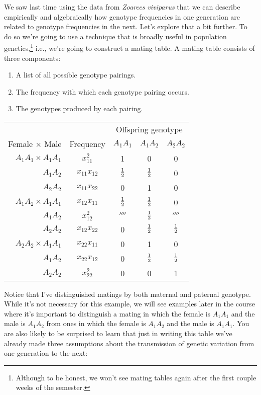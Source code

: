 \documentclass[12pt]{article}
\begin{document}
We saw last time using the data from {\it Zoarces viviparus\/} that we
can describe empirically and algebraically how genotype frequencies in
one generation are related to genotype frequencies in the next. Let's
explore that a bit further. To do so we're going to use a technique
that is broadly useful in population genetics,\footnote{Although to be
  honest, we won't see mating tables again after the first couple
  weeks of the semester.} i.e., we're going to
construct a mating table. A mating table consists of three
components:

\begin{enumerate}

\item A list of all possible genotype pairings.

\item The frequency with which each genotype pairing occurs.

\item The genotypes produced by each pairing.

\end{enumerate}

\begin{center}
\begin{tabular}{rcccc}
\hline\hline
                       &           & \multicolumn{3}{c}{Offspring genotype} \\
Female $\times$ Male   & Frequency     & $A_1A_1$ & $A_1A_2$ & $A_2A_2$ \\
\hline
$A_1A_1 \times A_1A_1$ & $x_{11}^2$     &        1 &        0 &        0 \\
              $A_1A_2$ & $x_{11}x_{12}$ &    $\frac{1}{2}$ &    $\frac{1}{2}$ &        0 \\
              $A_2A_2$ & $x_{11}x_{22}$ &        0 &        1 &        0 \\
$A_1A_2 \times A_1A_1$ & $x_{12}x_{11}$ &    $\frac{1}{2}$ &    $\frac{1}{2}$ &        0 \\
              $A_1A_2$ & $x_{12}^2$     &  $\fourth$ &    $\frac{1}{2}$ &  $\fourth$ \\
              $A_2A_2$ & $x_{12}x_{22}$ &        0 &    $\frac{1}{2}$ &    $\frac{1}{2}$ \\
$A_2A_2 \times A_1A_1$ & $x_{22}x_{11}$ &        0 &        1 &        0 \\
              $A_1A_2$ & $x_{22}x_{12}$ &        0 &    $\frac{1}{2}$ &    $\frac{1}{2}$ \\
              $A_2A_2$ & $x_{22}^2$     &        0 &         0 &
                       1 \\
\hline
\end{tabular}
\end{center}
Notice that I've distinguished matings by both maternal and paternal
genotype. While it's not necessary for this example, we will see
examples later in the course where it's important to distinguish a
mating in which the female is $A_1A_1$ and the male is $A_1A_2$ from
ones in which the female is $A_1A_2$ and the male is $A_1A_1$. You are
also likely to be surprised to learn that just in writing this table
we've already made three assumptions about the transmission of genetic
variation from one generation to the next:
\end{document}
